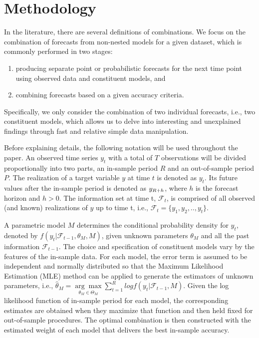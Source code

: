 \documentclass{monashthesis}
\begin{document}
\hypertarget{method}{%
\chapter{Methodology}\label{method}}

In the literature, there are several definitions of combinations. We focus on the combination of forecasts from non-nested models for a given dataset, which is commonly performed in two stages:

\begin{enumerate}
\def\labelenumi{\arabic{enumi}.}
\item
  producing separate point or probabilistic forecasts for the next time point using observed data and constituent models, and
\item
  combining forecasts based on a given accuracy criteria.
\end{enumerate}

Specifically, we only consider the combination of two individual forecasts, i.e., two constituent models, which allows us to delve into interesting and unexplained findings through fast and relative simple data manipulation.

Before explaining details, the following notation will be used throughout the paper. An observed time series \(y_t\) with a total of \(T\) observations will be divided proportionally into two parts, an in-sample period \(R\) and an out-of-sample period \(P\). The realization of a target variable \(y\) at time \(t\) is denoted as \(y_t\). Its future values after the in-sample period is denoted as \(y_{\small{R+h}}\), where \(h\) is the forecast horizon and \(h>0\). The information set at time t, \(\mathcal{F}_t\), is comprised of all observed (and known) realizations of \(y\) up to time t, i.e., \(\mathcal{F}_t = \{y_1, y_2, .., y_t\}\).

A parametric model \(M\) determines the conditional probability density for \(y_t\), denoted by \(f(y_t|\mathcal{F}_{t-1}, \theta_M, M)\), given unknown parameters \(\theta_M\) and all the past information \(\mathcal{F}_{t-1}\). The choice and specification of constituent models vary by the features of the in-sample data. For each model, the error term is assumed to be independent and normally distributed so that the Maximum Likelihood Estimation (MLE) method can be applied to generate the estimators of unknown parameters, i.e., \(\hat\theta_M = \underset{\theta_M \in \Theta_M}{\arg\max} \sum^R_{t=1} log f(y_t|\mathcal{F}_{t-1}, M)\). Given the log likelihood function of in-sample period for each model, the corresponding estimates are obtained when they maximize that function and then held fixed for out-of-sample procedures. The optimal combination is then constructed with the estimated weight of each model that delivers the best in-sample accuracy.
\end{document}
